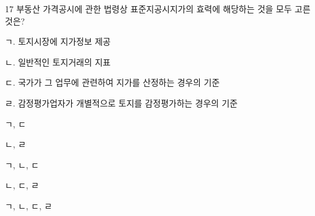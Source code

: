 \begin{question}{17}
부동산 가격공시에 관한 법령상 표준지공시지가의 효력에 해당하는 것을 모두 고른 것은?
\begin{framedtext}
ㄱ. 토지시장에 지가정보 제공 \par
ㄴ. 일반적인 토지거래의 지표 \par
ㄷ. 국가가 그 업무에 관련하여 지가를 산정하는 경우의 기준 \par
ㄹ. 감정평가업자가 개별적으로 토지를 감정평가하는 경우의 기준 \par
\end{framedtext}
\begin{choices}
  \item ㄱ, ㄷ
  \item ㄴ, ㄹ
  \item ㄱ, ㄴ, ㄷ
  \item ㄴ, ㄷ, ㄹ
  \item ㄱ, ㄴ, ㄷ, ㄹ
\end{choices}
\end{question}
